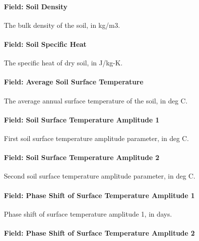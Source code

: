 \paragraph{Field: Soil Density}\label{field-soil-density-2}

The bulk density of the soil, in kg/m3.

\paragraph{Field: Soil Specific Heat}\label{field-soil-specific-heat-2}

The specific heat of dry soil, in J/kg-K.

\paragraph{Field: Average Soil Surface Temperature}\label{field-average-soil-surface-temperature-000}

The average annual surface temperature of the soil, in deg C.

\paragraph{Field: Soil Surface Temperature Amplitude 1}\label{field-soil-surface-temperature-amplitude-1}

First soil surface temperature amplitude parameter, in deg C.

\paragraph{Field: Soil Surface Temperature Amplitude 2}\label{field-soil-surface-temperature-amplitude-2}

Second soil surface temperature amplitude parameter, in deg C.

\paragraph{Field: Phase Shift of Surface Temperature Amplitude 1}\label{field-phase-shift-of-surface-temperature-amplitude-1}

Phase shift of surface temperature amplitude 1, in days.

\paragraph{Field: Phase Shift of Surface Temperature Amplitude 2}\label{field-phase-shift-of-surface-temperature-amplitude-2}

